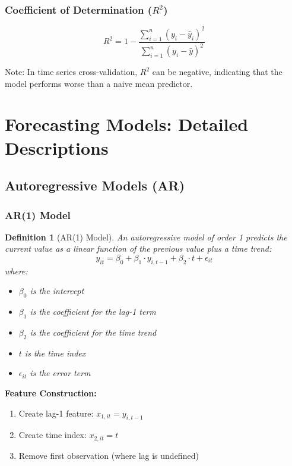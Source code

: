\documentclass[12pt,a4paper]{article}
\newtheorem{definition}{Definition}[section]
\begin{document}
\subsubsection{Coefficient of Determination ($R^2$)}
\begin{equation}
R^2 = 1 - \frac{\sum_{i=1}^{n}(y_i - \hat{y}_i)^2}{\sum_{i=1}^{n}(y_i - \bar{y})^2}
\end{equation}

Note: In time series cross-validation, $R^2$ can be negative, indicating that the model performs worse than a naive mean predictor.

\section{Forecasting Models: Detailed Descriptions}

\subsection{Autoregressive Models (AR)}

\subsubsection{AR(1) Model}

\begin{definition}[AR(1) Model]
An autoregressive model of order 1 predicts the current value as a linear function of the previous value plus a time trend:
\begin{equation}
y_{it} = \beta_0 + \beta_1 \cdot y_{i,t-1} + \beta_2 \cdot t + \epsilon_{it}
\end{equation}
where:
\begin{itemize}
    \item $\beta_0$ is the intercept
    \item $\beta_1$ is the coefficient for the lag-1 term
    \item $\beta_2$ is the coefficient for the time trend
    \item $t$ is the time index
    \item $\epsilon_{it}$ is the error term
\end{itemize}
\end{definition}

\textbf{Feature Construction:}
\begin{enumerate}
    \item Create lag-1 feature: $x_{1,it} = y_{i,t-1}$
    \item Create time index: $x_{2,it} = t$
    \item Remove first observation (where lag is undefined)
\end{enumerate}
\end{document}
